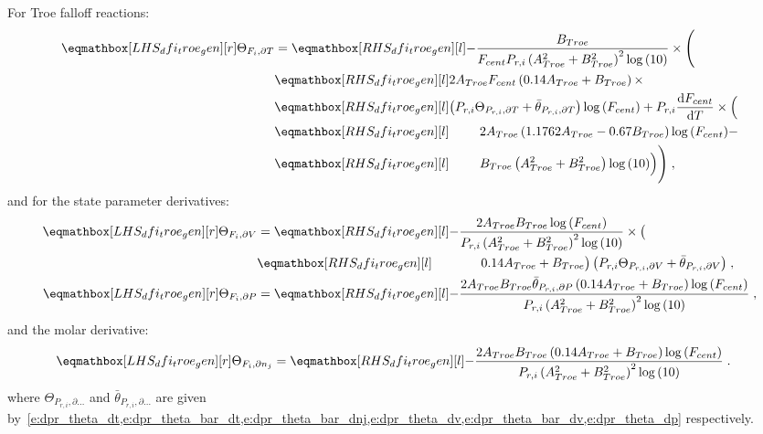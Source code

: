 \documentclass[12pt,number,sort&compress]{elsarticle}
\begin{document}
For Troe falloff reactions:
\begin{align}
\label{e:dfi_troe_dt_prod}
\lhs{dfi_troe_gen}{\Theta_{F_i, \partial T}} &=
\rhs{dfi_troe_gen}{ - \frac{B_{Troe}}{F_{cent} P_{r, i} \left(A_{Troe}^{2} + B_{Troe}^{2}\right)^{2} \log{\left (10 \right )}} \times \Biggl(} \nonumber \\
&\rhs{dfi_troe_gen}{ 2 A_{Troe} F_{cent} \left(0.14 A_{Troe} + B_{Troe}\right) \times } \nonumber \\
&\rhs{dfi_troe_gen}{\left( P_{r, i} \Theta_{P_{r,i}, \partial T} + \bar{\theta}_{P_{r, i}, \partial T}\right) \log{\left (F_{cent} \right )} + P_{r, i} \frac{\text{d} F_{cent} }{\text{d} T } \times \Bigl(} \nonumber \\
&\rhs{dfi_troe_gen}{\mathindent 2 A_{Troe} \left(1.1762 A_{Troe} - 0.67 B_{Troe}\right) \log{\left (F_{cent} \right )} - } \nonumber \\
&\rhs{dfi_troe_gen}{\mathindent B_{Troe} \left(A_{Troe}^{2} + B_{Troe}^{2}\right) \log{\left (10 \right )}\Bigr)\Biggr)} \;,
\end{align}
and for the state parameter derivatives:
\begin{subequations}
 \label{e:dfi_troe_de_prod}
 \begin{align}
   \lhs{dfi_troe_gen}{\Theta_{F_i, \partial V}} &= \rhs{dfi_troe_gen}{- \frac{2 A_{Troe} B_{Troe} \log{\left (F_{cent} \right )}}{P_{r, i} \left(A_{Troe}^{2} + B_{Troe}^{2}\right)^{2} \log{\left (10 \right )}} \times \bigl(} \nonumber \\
					    & \rhs{dfi_troe_gen}{\mathindent[alittlebit] 0.14 A_{Troe} + B_{Troe}\bigr) \left(P_{r, i} \Theta_{P_{r,i}, \partial V} + \bar{\theta}_{P_{r, i}, \partial V}\right)} \;, \\
   \lhs{dfi_troe_gen}{\Theta_{F_i, \partial P}} &= \rhs{dfi_troe_gen}{- \frac{2 A_{Troe} B_{Troe} \bar{\theta}_{P_{r, i}, \partial P} \left(0.14 A_{Troe} + B_{Troe}\right) \log{\left (F_{cent} \right )}}{P_{r, i} \left(A_{Troe}^{2} + B_{Troe}^{2}\right)^{2} \log{\left (10 \right )}}}\;,
 \end{align}
\end{subequations}
and the molar derivative:
\begin{align}
 \label{e:dfi_troe_dnj_prod}
\lhs{dfi_troe_gen}{\Theta_{F_i, \partial n_j}} &= \rhs{dfi_troe_gen}{- \frac{2 A_{Troe} B_{Troe} \left(0.14 A_{Troe} + B_{Troe}\right) \log{\left (F_{cent} \right )}}{P_{r, i} \left(A_{Troe}^{2} + B_{Troe}^{2}\right)^{2} \log{\left (10 \right )}}}\;.
\end{align}
where $\Theta_{P_{r,i}, \partial \ldots}$ and $\bar{\theta}_{P_{r, i}, \partial \ldots}$ are given by~\cref{e:dpr_theta_dt,e:dpr_theta_bar_dt,e:dpr_theta_bar_dnj,e:dpr_theta_dv,e:dpr_theta_bar_dv,e:dpr_theta_dp} respectively.
\end{document}
